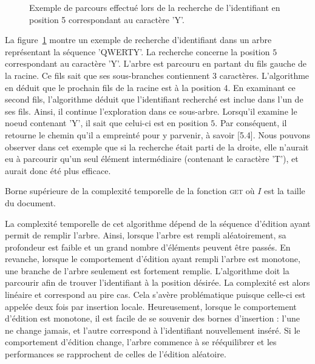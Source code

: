 \begin{figure}
  \centering
  
  \caption{\label{repl:fig:getexample} Exemple de parcours effectué lors de la
    recherche de l'identifiant en position 5 correspondant au caractère 'Y'.}
\end{figure}

La figure~\ref{repl:fig:getexample} montre un exemple de recherche d'identifiant
dans un arbre représentant la séquence 'QWERTY'. La recherche concerne la
position $5$ correspondant au caractère 'Y'. L'arbre est parcouru en partant du
fils gauche de la racine. Ce fils sait que ses sous-branches contiennent 3
caractères. L'algorithme en déduit que le prochain fils de la racine est à la
position 4. En examinant ce second fils, l'algorithme déduit que l'identifiant
recherché est inclue dans l'un de ses fils. Ainsi, il continue l'exploration
dans ce sous-arbre. Lorsqu'il examine le noeud contenant 'Y', il sait que
celui-ci est en position $5$. Par conséquent, il retourne le chemin qu'il a
empreinté pour y parvenir, à savoir [5.4]. Nous pouvons observer dans cet
exemple que si la recherche était parti de la droite, elle n'aurait eu à
parcourir qu'un seul élément intermédiaire (contenant le caractère 'T'), et
aurait donc été plus efficace.


\begin{wraptable}{r}{0.5\textwidth}
  
  \caption{\label{repl:table:get} Borne supérieure de la complexité temporelle de la fonction \textsc{get} où $I$ est la taille du document.}  
\end{wraptable}

La complexité temporelle de cet algorithme dépend de la séquence d'édition ayant
permit de remplir l'arbre. Ainsi, lorsque l'arbre est rempli aléatoirement, sa
profondeur est faible et un grand nombre d'éléments peuvent être passés. En
revanche, lorsque le comportement d'édition ayant rempli l'arbre est monotone,
une branche de l'arbre seulement est fortement remplie. L'algorithme doit la
parcourir afin de trouver l'identifiant à la position désirée. La complexité est
alors linéaire et correspond au pire cas. Cela s'avère problématique puisque
celle-ci est appelée deux fois par insertion locale. Heureusement, lorsque le
comportement d'édition est monotone, il est facile de se souvenir des bornes
d'insertion : l'une ne change jamais, et l'autre correspond à l'identifiant
nouvellement inséré. Si le comportement d'édition change, l'arbre commence à se
rééquilibrer et les performances se rapprochent de celles de l'édition
aléatoire.

